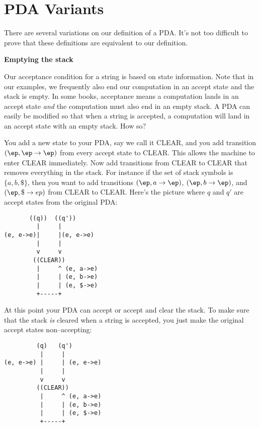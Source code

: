 \section{PDA Variants}

There are several variations on our definition of a PDA. 
It's not too difficult to prove that these definitions are equivalent to our 
definition.

\textbf{Emptying the stack}

Our acceptance condition for a string is based on state information.
Note that in our examples, we frequently also end our computation in an
accept state and the stack is empty.
In some books, acceptance means a computation lands in an accept state 
\textit{ and} the computation must also end in an empty stack.
A PDA can easily be modified so that when a string is accepted, a computation
will land in an accept state with an empty stack.
How so?

You add a new state to your PDA, say we call it CLEAR, and you add
transition $(\ep, \ep \rightarrow \ep)$ from every accept state to CLEAR.
This allows the machine to enter CLEAR immediately.
Now add transitions from CLEAR to CLEAR that removes everything in the stack.
For instance if the set of stack symbols is $\{a, b, \$\}$, then you want to 
add transitions $(\ep, a \rightarrow \ep)$, $(\ep, b \rightarrow \ep)$,
and $(\ep, \$ \rightarrow ep)$ from CLEAR to CLEAR.
Here's the picture where $q$ and $q'$ are accept states from the original PDA:
\begin{center}
\begin{verbatim}
       ((q))  ((q'))
         |     |
(e, e->e)|     |(e, e->e)
         |     |
         v     v
        ((CLEAR))
         |     ^ (e, a->e)
         |     | (e, b->e)
         |     | (e, $->e)
         +-----+
\end{verbatim}
\end{center}

At this point your PDA can accept or accept and clear the stack. 
To make sure that the stack \textit{ is} cleared when a string is accepted, you
just make the original accept states non--accepting:

\begin{center}
\begin{verbatim}
         (q)   (q')
          |     |
(e, e->e) |     | (e, e->e)
          |     |
          v     v
         ((CLEAR))
          |     ^ (e, a->e)
          |     | (e, b->e)
          |     | (e, $->e)
          +-----+
\end{verbatim}
\end{center}

